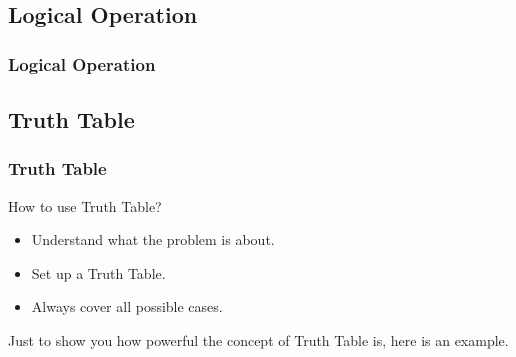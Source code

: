 \documentclass[12pt, t]{beamer}
\begin{document}
\subsection{Logical Operation }
\begin{frame}
    \frametitle{Logical Operation}
    \vspace{1.5cm}
    \begin{table}
        \centering
    \end{table}

\end{frame}

\subsection{Truth Table}
\begin{frame}
    \frametitle{Truth Table}
    How to use Truth Table?
    \begin{itemize}
        \item Understand what the problem is about.
        \item Set up a Truth Table.
        \item Always cover all possible cases.
    \end{itemize}
    Just to show you how powerful the concept of Truth Table is, here is an example.
\end{frame}
\end{document}
